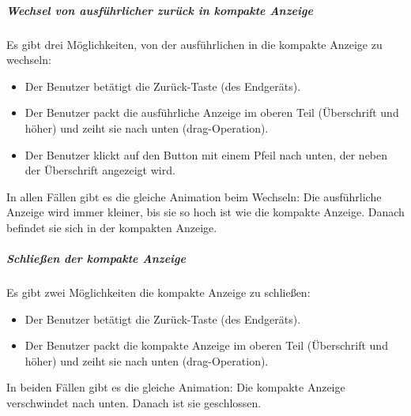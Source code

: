 \subparagraph*{Wechsel von ausführlicher zurück in kompakte Anzeige}
Es gibt drei Möglichkeiten, von der ausführlichen in die kompakte Anzeige zu wechseln:
\begin{itemize}
    \item Der Benutzer betätigt die Zurück-Taste (des Endgeräts).
    \item Der Benutzer packt die ausführliche Anzeige im oberen Teil (Überschrift und höher) und zeiht sie nach unten (drag-Operation).
    \item Der Benutzer klickt auf den Button mit einem Pfeil nach unten, der neben der Überschrift angezeigt wird.
\end{itemize}
In allen Fällen gibt es die gleiche Animation beim Wechseln: Die ausführliche Anzeige wird immer 
kleiner, bis sie so hoch ist wie die kompakte Anzeige. Danach befindet sie sich in der kompakten Anzeige.

\subparagraph*{Schließen der kompakte Anzeige}
Es gibt zwei Möglichkeiten die kompakte Anzeige zu schließen:
\begin{itemize}
    \item Der Benutzer betätigt die Zurück-Taste (des Endgeräts).
    \item Der Benutzer packt die kompakte Anzeige im oberen Teil (Überschrift und höher) und zeiht sie nach unten (drag-Operation). 
\end{itemize}
In beiden Fällen gibt es die gleiche Animation: Die kompakte Anzeige verschwindet nach unten. Danach ist sie geschlossen.
